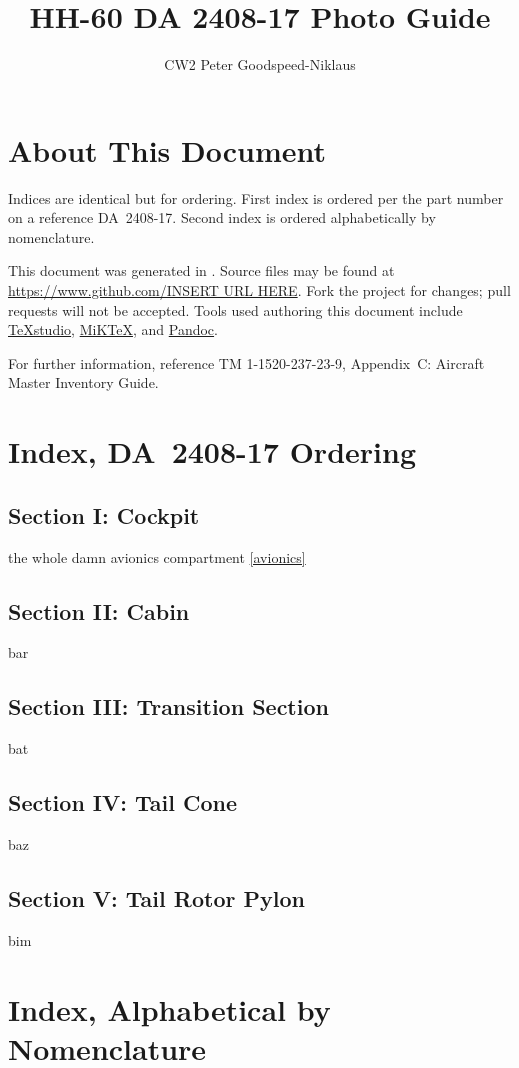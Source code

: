\documentclass[letterpaper,11pt,openany,oneside]{book}
\author{CW2 Peter Goodspeed-Niklaus}
\title{HH-60 DA 2408-17 Photo Guide}
\begin{document}
\frontmatter
\maketitle
\clearpage
\setcounter{page}{1}
\chapter*{About This Document}
Indices are identical but for ordering. First index is ordered per the part number on a reference DA~2408-17. Second index is ordered alphabetically by nomenclature.

This document was generated in \LaTeXe. Source files may be found at \url{https://www.github.com/INSERT URL HERE}. Fork the project for changes; pull requests will not be accepted. Tools used authoring this document include \href{http://texstudio.sourceforge.net/}{TeXstudio}, \href{http://miktex.org/}{MiKTeX}, and \href{http://johnmacfarlane.net/pandoc/}{Pandoc}.

For further information, reference TM 1-1520-237-23-9, Appendix~C: Aircraft Master Inventory Guide.
\mainmatter
\chapter*{Index, DA~2408-17 Ordering}
\section*{Section I: Cockpit}
the whole damn avionics compartment \ref{avionics}
\section*{Section II: Cabin}
bar
\section*{Section III: Transition Section}
bat
\section*{Section IV: Tail Cone}
baz
\section*{Section V: Tail Rotor Pylon}
bim
\chapter*{Index, Alphabetical by Nomenclature}
\end{document}
